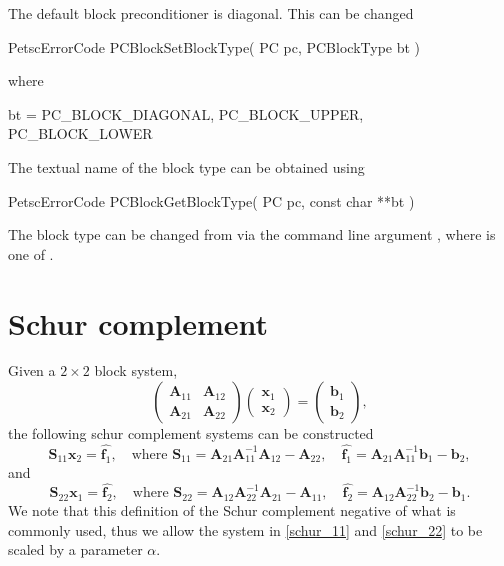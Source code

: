\documentclass[10pt,a4paper]{amsart}
\renewcommand{\v}[1]{\boldsymbol{#1}}		%
\newcommand{\m}[1]{\boldsymbol{#1}}		%
\newcommand{\code}[1]{{\fontfamily{txtt}\selectfont {#1}}}
\begin{document}
The default block preconditioner is diagonal. This can be changed 
\begin{verbatimtab}[4]
	PetscErrorCode PCBlockSetBlockType( PC pc, PCBlockType bt )
\end{verbatimtab}
where 
\begin{verbatimtab}[4]
	bt = { PC_BLOCK_DIAGONAL, PC_BLOCK_UPPER, PC_BLOCK_LOWER } 
\end{verbatimtab}
The textual name of the block type can be obtained using 
\begin{verbatimtab}[4]
	PetscErrorCode PCBlockGetBlockType( PC pc, const char **bt )
\end{verbatimtab}
The block type can be changed from via the command line argument \code{-pc\_block\_type TYPE}, where \code{TYPE} is one of \code{ <diagonal, upper, lower>}. 






\section{Schur complement}

	Given a $2 \times 2$ block system, 
\begin{equation}
\begin{pmatrix}
	\m A_{11}	&\m A_{12} \\
	\m A_{21}	&\m A_{22}
\end{pmatrix}
\begin{pmatrix}
	\v x_{1}	\\
	\v x_{2}	
\end{pmatrix}
=
\begin{pmatrix}
	\v b_{1}	\\
	\v b_{2}	
\end{pmatrix},
\end{equation}
the following schur complement systems can be constructed
\begin{equation}
	\m S_{11} \v x_2 = \hat{\v f_1}, 
	\quad \mbox{where } \m S_{11} = \m A_{21} \m A_{11}^{-1} \m A_{12} - \m A_{22}, 
	\quad \hat{\v f_1} = \m A_{21} \m A_{11}^{-1} \v b_1 - \v b_2,
	\label{schur_11}
\end{equation}
and
\begin{equation}
	\m S_{22} \v x_1 = \hat{\v f_2}, 
	\quad \mbox{where } \m S_{22} = \m A_{12} \m A_{22}^{-1} \m A_{21} - \m A_{11}, 
	\quad \hat{\v f_2} = \m A_{12} \m A_{22}^{-1} \v b_2 - \v b_1.
	\label{schur_22}
\end{equation}
We note that this definition of the Schur complement negative of what is commonly used, thus we allow the system in \eqref{schur_11} and \eqref{schur_22} to be scaled by a parameter $\alpha$.
\end{document}
